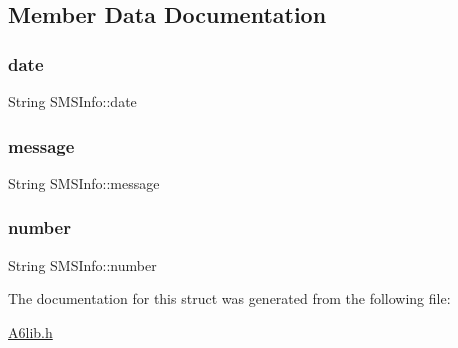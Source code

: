 \subsection{Member Data Documentation}
\mbox{\label{struct_s_m_s_info_a79e458b6eab58167605195322c26ee6f}} 
\subsubsection{\texorpdfstring{date}{date}}
{\footnotesize\ttfamily String S\+M\+S\+Info\+::date}

\mbox{\label{struct_s_m_s_info_aa6acfef8d31d0b57f04e3782faf550bb}} 
\subsubsection{\texorpdfstring{message}{message}}
{\footnotesize\ttfamily String S\+M\+S\+Info\+::message}

\mbox{\label{struct_s_m_s_info_ad4574e2c51baaf47d01e738b6f2ecf41}} 
\subsubsection{\texorpdfstring{number}{number}}
{\footnotesize\ttfamily String S\+M\+S\+Info\+::number}



The documentation for this struct was generated from the following file\+:\begin{DoxyCompactItemize}
\item 
\mbox{\hyperlink{_a6lib_8h}{A6lib.\+h}}\end{DoxyCompactItemize}
